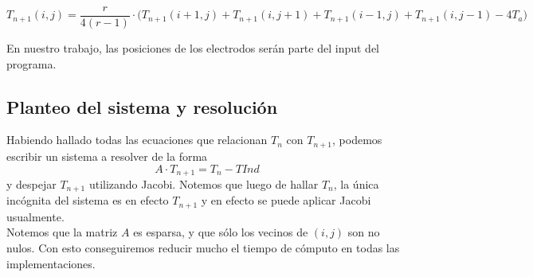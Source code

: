 \documentclass[a4paper]{article}
\begin{document}
$$T_{n+1}(i,j) = \frac{r}{4(r-1)} \cdot \big( T_{n+1}(i+1,j) + T_{n+1}(i,j+1) + T_{n+1}(i-1,j) + T_{n+1}(i,j-1) - 4T_a \big)$$

En nuestro trabajo, las posiciones de los electrodos serán parte del input del programa.

\subsection{Planteo del sistema y resolución}

Habiendo hallado todas las ecuaciones que relacionan $T_n$ con $T_{n+1}$, podemos escribir un sistema a resolver de la forma $$A \cdot T_{n+1} = T_n - TInd$$ y despejar $T_{n+1}$ utilizando Jacobi. Notemos que luego de hallar $T_n$, la única incógnita del sistema es en efecto $T_{n+1}$ y en efecto se puede aplicar Jacobi usualmente.\\

Notemos que la matriz $A$ es esparsa, y que sólo los vecinos de $(i,j)$ son no nulos. Con esto conseguiremos reducir mucho el tiempo de cómputo en todas las implementaciones.
\end{document}
